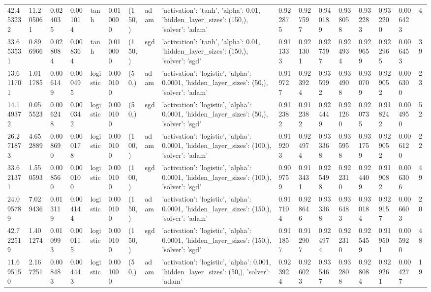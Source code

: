 \documentclass[a1paper]{article}  %
\begin{document}
\begin{landscape}
\begin{tabular}{lllllllllllllllll}
		42.453232 & 11.205061 & 0.024035 & 0.001014 & tanh & 0.010000 & (150,) & adam & {'activation': 'tanh', 'alpha': 0.01, 'hidden\_layer\_sizes': (150,), 'solver': 'adam'} & 0.922875 & 0.927597 & 0.940189 & 0.938058 & 0.932283 & 0.932200 & 0.006423 & 4 \\
		33.653531 & 0.896966 & 0.028084 & 0.008364 & tanh & 0.010000 & (150,) & sgd & {'activation': 'tanh', 'alpha': 0.01, 'hidden\_layer\_sizes': (150,), 'solver': 'sgd'} & 0.911333 & 0.921301 & 0.927597 & 0.924934 & 0.929659 & 0.922965 & 0.006453 & 39 \\
		13.611701 & 1.011785 & 0.006149 & 0.000495 & logistic & 0.000100 & (50,) & adam & {'activation': 'logistic', 'alpha': 0.0001, 'hidden\_layer\_sizes': (50,), 'solver': 'adam'} & 0.919727 & 0.923924 & 0.935992 & 0.934908 & 0.930709 & 0.929052 & 0.006300 & 23 \\
		14.149372 & 0.055523 & 0.006248 & 0.000342 & logistic & 0.000100 & (50,) & sgd & {'activation': 'logistic', 'alpha': 0.0001, 'hidden\_layer\_sizes': (50,), 'solver': 'sgd'} & 0.912382 & 0.912382 & 0.924449 & 0.921260 & 0.920735 & 0.918242 & 0.004950 & 52 \\
		26.271873 & 4.652889 & 0.008690 & 0.000178 & logistic & 0.000100 & (100,) & adam & {'activation': 'logistic', 'alpha': 0.0001, 'hidden\_layer\_sizes': (100,), 'solver': 'adam'} & 0.919203 & 0.924974 & 0.933368 & 0.935958 & 0.931759 & 0.929052 & 0.006120 & 22 \\
		33.621371 & 1.550593 & 0.008560 & 0.000100 & logistic & 0.000100 & (100,) & sgd & {'activation': 'logistic', 'alpha': 0.0001, 'hidden\_layer\_sizes': (100,), 'solver': 'sgd'} & 0.909759 & 0.913431 & 0.925498 & 0.922310 & 0.924409 & 0.919082 & 0.006306 & 49 \\
		24.095789 & 7.029436 & 0.013119 & 0.004144 & logistic & 0.000100 & (150,) & adam & {'activation': 'logistic', 'alpha': 0.0001, 'hidden\_layer\_sizes': (150,), 'solver': 'adam'} & 0.917104 & 0.928646 & 0.933368 & 0.936483 & 0.930184 & 0.929157 & 0.006603 & 20 \\
		42.722519 & 1.401274 & 0.010993 & 0.000115 & logistic & 0.000100 & (150,) & sgd & {'activation': 'logistic', 'alpha': 0.0001, 'hidden\_layer\_sizes': (150,), 'solver': 'sgd'} & 0.911857 & 0.912907 & 0.924974 & 0.922310 & 0.925459 & 0.919501 & 0.005920 & 48 \\
		11.695150 & 2.167251 & 0.008483 & 0.004443 & logistic & 0.001000 & (50,) & adam & {'activation': 'logistic', 'alpha': 0.001, 'hidden\_layer\_sizes': (50,), 'solver': 'adam'} & 0.923924 & 0.926023 & 0.935467 & 0.932808 & 0.928084 & 0.929261 & 0.004277 & 19 \\

\end{tabular}
\end{landscape}
\end{document}
